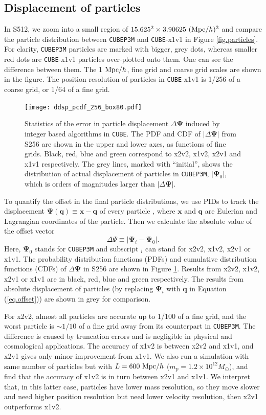 \documentclass[10pt,twocolumn,preprint]{emulateapj}
\newcommand{\bs}{\boldsymbol}
\newcommand{\Msun}{M_\odot}
\begin{document}
\subsection{Displacement of particles}
In S512, we zoom into a small region of $15.625^2\times 3.90625\ ({\rm Mpc}/h)^3$ and compare the particle distribution between {\tt CUBEP3M} and {\tt CUBE}-x1v1 in Figure \ref{fig.particles}. For clarity, {\tt CUBEP3M} particles are marked with bigger, grey dots, whereas smaller red dots are {\tt CUBE}-x1v1 particles over-plotted onto them. One can see the difference between them. The 1 ${\rm Mpc}/h$, fine grid and coarse grid scales are shown in the figure. The position resolution of particles in {\tt CUBE}-x1v1 is 1/256 of a coarse grid, or 1/64 of a fine grid.
\begin{figure}[]
\centering
  \texttt{[image: ddsp\_pcdf\_256\_box80.pdf]}
 \caption{Statistics of the error in particle displacement $\Delta{\bs\Psi}$ induced by integer based algorithms in {\tt CUBE}. The PDF and CDF of $|\Delta{\bs\Psi}|$ from S256 are shown in the upper and lower axes, as functions of fine grids. Black, red, blue and green correspond to x2v2, x1v2, x2v1 and x1v1 respectively. The grey lines, marked with ``initial'', shows the distribution of actual displacement of particles in {\tt CUBEP3M}, $|{\bs\Psi}_0|$, which is orders of magnitudes larger than $|\Delta{\bs\Psi}|$. }
\label{fig.dsp}
\end{figure}


To quantify the offset in the final particle distributions, we use PIDs to track the displacement ${\bs \Psi}({\bs q})\equiv{\bs x}-{\bs q}$ of every particle \citep{2017PhRvD..95d3501Y}, where ${\bs x}$ and ${\bs q}$ are Eulerian and Lagrangian coordinates of the particle. Then we calculate the absolute value of the offset vector
\begin{equation}\label{eq.offset}
	\Delta\Psi\equiv|{\bs\Psi}_i-{\bs\Psi}_0|.
\end{equation}
Here, ${\bs\Psi}_0$ stands for {\tt CUBEP3M} and subscript $_i$ can stand for x2v2, x1v2, x2v1 or x1v1. The probability distribution functions (PDFs) and cumulative distribution functions (CDFs) of $\Delta\bs\Psi$ in S256 are shown in Figure \ref{fig.dsp}. Results from x2v2, x1v2, x2v1 or x1v1 are in black, red, blue and green respectively. The results from absolute displacement of particles (by replacing ${\bs\Psi}_i$ with ${\bs q}$ in Equation (\ref{eq.offset})) are shown in grey for comparison.

For x2v2, almost all particles are accurate up to 1/100 of a fine grid, and the worst particle is $\sim 1/10$ of a fine grid away from its counterpart in {\tt CUBEP3M}. The difference is caused by truncation errors and is negligible in physical and cosmological applications. The accuracy of x1v2 is between x2v2 and x1v1, and x2v1 gives only minor improvement from x1v1. We also run a simulation with same number of particles but with $L=600\ {\rm Mpc}/h$ ($m_p=1.2\times 10^{12}\Msun$), and find that the accuracy of x1v2 is in turn between x2v1 and x1v1. We interpret that, in this latter case, particles have lower mass resolution, so they move slower and need higher position resolution but need lower velocity resolution, then x2v1 outperforms x1v2.
\end{document}

